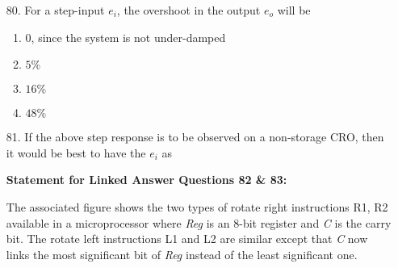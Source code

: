 \documentclass[journal,12pt,onecolumn]{IEEEtran}
\theoremstyle{remark}
\begin{document}
\begin{enumerate}
\begin{figure}[!ht]
\centering
{}%
\label{fig:my_label}
\end{figure}


    \item [80.] For a step-input $e_i$, the overshoot in the output $e_o$ will be
    \begin{enumerate}
        \item 0, since the system is not under-damped
        \item $5\%$
        \item $16\%$
        \item $48\%$
   \end{enumerate}

    \item [81.] If the above step response is to be observed on a non-storage CRO, then it would be best to have the $e_i$ as 
     \begin{enumerate}    
              \end{enumerate} 
     
      
  \textbf{Statement for Linked Answer Questions 82 \& 83:}

The associated figure shows the two types of rotate right instructions R1, R2 available in a microprocessor where \textit{Reg} is an 8-bit register and \textit{C} is the carry bit. The rotate left instructions L1 and L2 are similar except that \textit{C} now links the most significant bit of \textit{Reg} instead of the least significant one.
\begin{figure}[H]
\centering
\resizebox{0.6\textwidth}{!}{}
\end{figure}




\end{enumerate}
\end{document}
